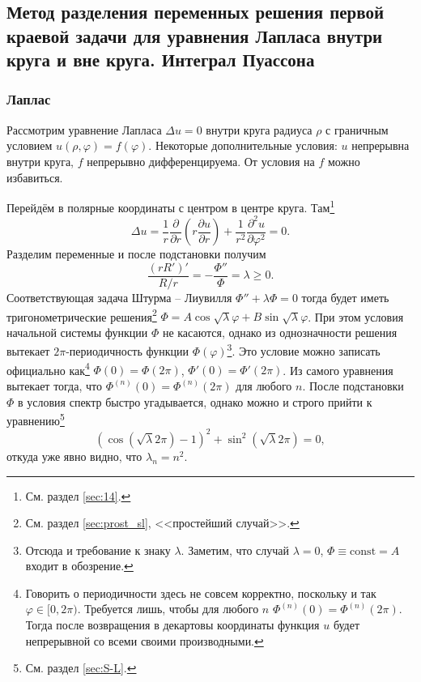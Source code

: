 \subsection{Метод разделения переменных решения первой краевой задачи для уравнения Лапласа внутри круга и вне круга. Интеграл Пуассона}
\subsubsection{Лаплас}
\label{sec:16}
Рассмотрим уравнение Лапласа $ \Delta u = 0 $ внутри круга радиуса $ \rho $ с граничным условием
$ u(\rho, \varphi) = f(\varphi) $. Некоторые дополнительные условия: $ u $ непрерывна внутри круга, $ f
$ непрерывно дифференцируема. От условия на $ f $ можно избавиться.

Перейдём в полярные координаты с центром в центре круга. Там\footnote{См. раздел
\ref{sec:14}.}
\[
    \Delta u = \frac{1}{r} \frac{\partial}{\partial r}\left( r \frac{\partial
    u}{\partial r} \right) + \frac{1}{r^2}\frac{\partial^2 u}{\partial
  \varphi^2} = 0.
\]
Разделим переменные и после подстановки получим
\[
    \frac{(rR')'}{R/r} = - \frac{\Phi''}{\Phi} = \lambda \geqslant 0.
\]
Соответствующая задача Штурма -- Лиувилля $ \Phi'' + \lambda\Phi = 0 $
тогда будет иметь тригонометрические решения\footnote{См. раздел \ref{sec:prost_sl}, <<простейший
случай>>.} $ \Phi = A\cos\sqrt\lambda \varphi + B\sin\sqrt\lambda \varphi $.
При этом условия начальной системы функции $ \Phi $ не касаются, однако из
однозначности решения вытекает $ 2\pi $-периодичность функции $ \Phi(\varphi)
$\footnote{Отсюда и требование к знаку $ \lambda $. Заметим, что случай
$ \lambda = 0 $, $\Phi \equiv \mathrm{const} = A $ входит в обозрение.}.
Это условие можно записать официально как\footnote{Говорить о периодичности
  здесь не совсем корректно, поскольку и так $ \varphi \in [0, 2\pi) $.
Требуется лишь, чтобы для любого $ n $ $ \Phi^{(n)}(0) = \Phi^{(n)}(2\pi) $.
Тогда после возвращения в декартовы координаты функция $ u $ будет непрерывной
со всеми своими производными.} $ \Phi(0) = \Phi(2\pi) $, $ \Phi'(0) =
\Phi'(2\pi) $. Из самого уравнения вытекает тогда, что $ \Phi^{(n)}(0) =
\Phi^{(n)}(2\pi) $ для любого $ n $. После подстановки $ \Phi $ в условия спектр
быстро угадывается, однако можно и строго прийти к уравнению\footnote{См. раздел
\ref{sec:S-L}.} 
\[
  \left(\cos ( \sqrt\lambda 2\pi ) - 1\right)^2 + \sin^2 \left(\sqrt\lambda2\pi\right)=0,
\]
откуда уже явно видно, что $ \lambda_n = n^2 $.

